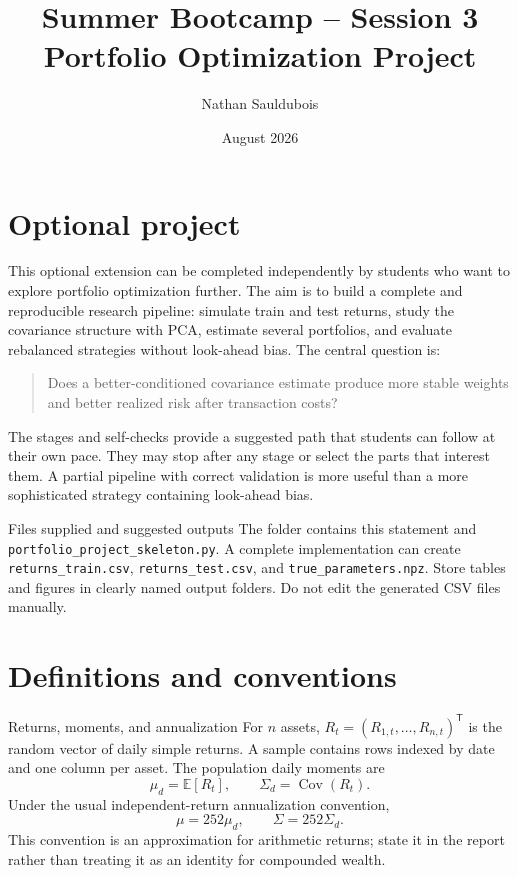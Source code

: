 \documentclass[10pt]{article}
\title{Summer Bootcamp -- Session 3\\Portfolio Optimization Project}
\author{Nathan Sauldubois}
\date{August 2026}
\newcommand{\E}{\mathbb{E}}
\newcommand{\Cov}{\operatorname{Cov}}
\newcommand{\trans}{^{\mathsf T}}
\begin{document}
\maketitle

\section*{Optional project}

This optional extension can be completed independently by students who want to
explore portfolio optimization further. The aim is to build a complete and
reproducible research pipeline: simulate train and test returns, study the
covariance structure with PCA, estimate several portfolios, and evaluate
rebalanced strategies without look-ahead bias. The central question is:

\begin{quote}
Does a better-conditioned covariance estimate produce more stable weights and
better realized risk after transaction costs?
\end{quote}

The stages and self-checks provide a suggested path that students can follow at
their own pace. They may stop after any stage or select the parts that interest
them. A partial pipeline with correct validation is more useful than a more
sophisticated strategy containing look-ahead bias.

\begin{deliverablebox}{Files supplied and suggested outputs}
The folder contains this statement and
\texttt{portfolio\_project\_skeleton.py}. A complete implementation can create
\texttt{returns\_train.csv}, \texttt{returns\_test.csv}, and
\texttt{true\_parameters.npz}. Store tables and figures in clearly named
output folders. Do not edit the generated CSV files manually.
\end{deliverablebox}

\section{Definitions and conventions}

\begin{definitionbox}{Returns, moments, and annualization}
For $n$ assets, $R_t=(R_{1,t},\ldots,R_{n,t})\trans$ is the random vector of
daily simple returns. A sample contains rows indexed by date and one column per
asset. The population daily moments are
\[
\mu_d=\E[R_t],\qquad \Sigma_d=\Cov(R_t).
\]
Under the usual independent-return annualization convention,
\[
\mu=252\mu_d,\qquad \Sigma=252\Sigma_d.
\]
This convention is an approximation for arithmetic returns; state it in the
report rather than treating it as an identity for compounded wealth.
\end{definitionbox}
\end{document}
